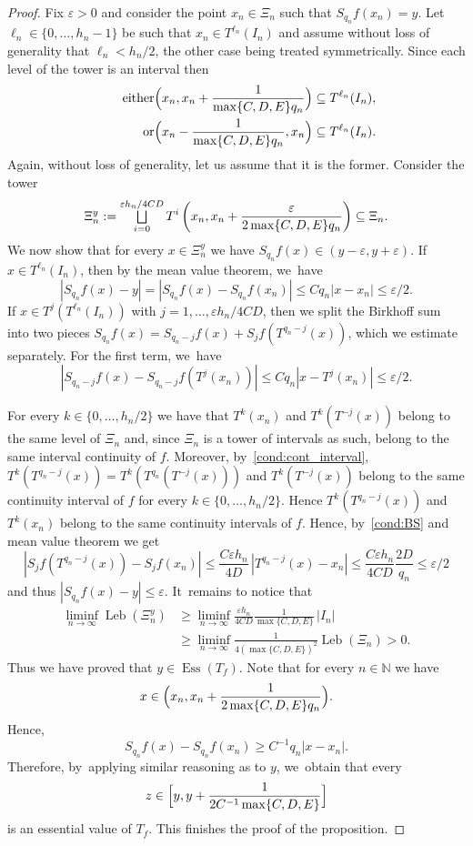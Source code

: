 \documentclass[10pt,a4paper]{amsart}
\let\oldbigsqcup\bigsqcup
\renewcommand{\bigsqcup}{\mathop{\textstyle\oldbigsqcup}\displaylimits}
\let\epsilon\varepsilon
\DeclareMathOperator{\Ess}{Ess}
\DeclareMathOperator{\Leb}{Leb}
\theoremstyle{plain}
\theoremstyle{definition}
\newcommand{\N}{\mathbb{N}}
\begin{document}
\begin{proof}
Fix $\epsilon>0$ and consider the point {$x_n \in \Xi_n$ such that $S_{q_n}f(x_n)=y$}.
Let $\ell_n\in\{0,\ldots,h_n-1\}$ be such that $x_n\in T^{\ell_n}(I_n)$ and assume without loss of generality that $\ell_n<h_{n}/2$, the other case being treated symmetrically. Since each level of the tower is an interval then
\begin{align*}
\tag*{either}
\Bigl(x_n,x_n+\frac{1}{\max\{C, D,E\} q_n}\Bigr)\subseteq T^{\ell_n}(I_n),\\
\tag*{or} \Bigl(x_n-\frac{1}{\max\{C,D,E\} q_n},x_n\Bigr)\subseteq T^{\ell_n}(I_n).
\end{align*}
Again, without loss of generality, let us assume that it is the former. Consider the tower
\[
\Xi_n^y:=\bigsqcup_{i=0}^{\epsilon h_n/4CD} T^i\left(x_n,x_n+\frac{\epsilon}{2\max\{C,D,E\} q_n}\right)\subseteq \Xi_n.
\]
We now show that for every $x\in \Xi_n^y$ we have $S_{q_n}f(x)\in(y-\epsilon,y+\epsilon)$. If $x\in T^{\ell_n}(I_n)$, then by the mean value theorem, we~have
\[
\left|S_{q_n}f(x)-y\right|=\left|S_{q_n}f(x)-S_{q_n}f(x_n)\right|\le Cq_n|x-x_n|\le \epsilon/2.
\]
If $x\in T^{j} (T^{\ell_n}(I_n))$ with $j=1,\ldots,\epsilon h_n/4CD$, then we
split the Birkhoff sum into two pieces $S_{q_n}f(x) = S_{q_n - j}f (x) +
S_jf(T^{q_n - j}(x))$, which we estimate separately. For the first term, we~have
\[
\left|S_{q_n-j} f(x)-S_{q_n-j} f(T^j(x_n))\right|\le Cq_n|x-T^j(x_n)|\le\epsilon/2.
\]

For every $k\in\{0,\ldots,h_n/2\}$ we have that $T^{k}(x_n)$ and
$T^{k}(T^{-j}(x))$ belong to the same level of $\Xi_n$ and, since $\Xi_n$ is a
tower of intervals as such, belong to the same interval continuity of $f$.
Moreover, by~\eqref{cond:cont_interval}, $T^k(T^{q_n-j}(x))=T^k(T^{q_n}(T^{-j}(x)))$ and
$T^{k}(T^{-j}(x))$ belong to the same
continuity interval of $f$ for every $k\in\{0,\ldots,h_n/2\}$. Hence
$T^k(T^{q_n-j}(x))$ and $T^k(x_n)$ belong to the same continuity intervals of
$f$. Hence, by~\eqref{cond:BS} and mean value theorem we
get
\[
\left|S_j f(T^{q_n-j}(x))-S_j f(x_n)\right|\le \frac{C\epsilon h_n}{4D}\,|T^{q_n-j}(x)-x_n|\le \frac{C\epsilon h_n}{4CD} \frac{2D}{q_n}\le\epsilon/2
\]
and thus $|S_{q_n} f(x)-y|\le \epsilon$. It~remains to notice that
\begin{align*}
\liminf_{n\to\infty}\Leb(\Xi_n^y)&\ge \liminf_{n\to\infty}\frac{\epsilon h_n}{4CD}\frac{1}{\max\{C,D,E\}}\,|I_n|\\
&\ge \liminf_{n\to\infty} \frac{1}{4(\max\{C,D,E\})^2}\Leb(\Xi_n)>0.
\end{align*}
Thus we have proved that $y\in \Ess(T_f)$. Note that for every $n\in\N$ {we have}
\[
x\in \Bigl(x_n,x_n+\frac{1}{2\max\{C,D,E\} q_n}\Bigr).
\]
Hence,
\[
S_{q_n}f(x)-S_{q_n}f(x_n)\ge C^{-1}q_n |x-x_n|.
\]
Therefore, by~applying similar reasoning as to $y$, we~obtain that every
\[
z\in\Bigl[y,y+\frac{1}{2C^{-1}\max\{C,D,E\}}\Bigr]
\]
is an essential value of $T_f$. This finishes the proof of the proposition.
\end{proof}
\end{document}
